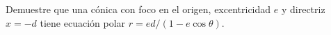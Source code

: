 \item Demuestre que una cónica con foco en el origen, excentricidad $e$ y directriz $x = -d$ tiene ecuación polar $r = ed / (1 - e \cos\theta)$.
